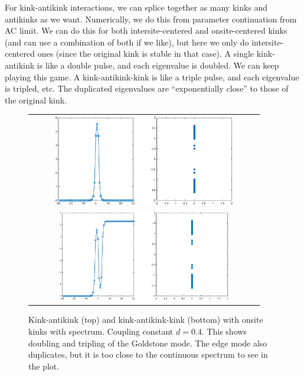 \documentclass[12pt]{article}
\begin{document}
For kink-antikink interactions, we can splice together as many kinks and antikinks as we want. Numerically, we do this from parameter continuation from AC limit. We can do this for both intersite-centered and onsite-centered kinks (and can use a combination of both if we like), but here we only do intersite-centered ones (since the original kink is stable in that case). A single kink-antikink is like a double pulse, and each eigenvalue is doubled. We can keep playing this game. A kink-antikink-kink is like a triple pulse, and each eigenvalue is tripled, etc. The duplicated eigenvalues are ``exponentially close'' to those of the original kink.
\begin{figure}[H]
\begin{center}
\begin{tabular}{c}
\includegraphics[height=4cm,width=10cm]{kinkantikink1.eps} \\
\includegraphics[height=4cm,width=10cm]{kinkantikinkkink1.eps} \\
\end{tabular}
\end{center}
\caption{Kink-antikink (top) and kink-antikink-kink (bottom) with onsite kinks with spectrum. Coupling constant $d = 0.4$. This shows doubling and tripling of the Goldstone mode. The edge mode also duplicates, but it is too close to the continuous spectrum to see in the plot.}
\end{figure}
\end{document}
